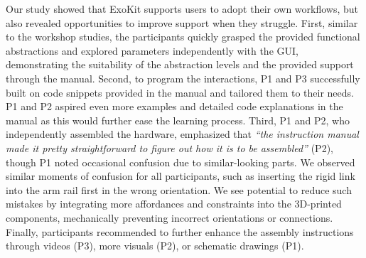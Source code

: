 Our study showed that ExoKit supports users to adopt their own workflows, but also revealed opportunities to improve support when they struggle.  
First, similar to the workshop studies, the participants quickly grasped the provided functional abstractions and explored parameters independently with the GUI, demonstrating the suitability of the abstraction levels and the provided support through the manual.  
Second, to program the interactions, P1 and P3 successfully built on code snippets provided in the manual and tailored them to their needs. P1 and P2 aspired even more examples and detailed code explanations in the manual as this would further ease the learning process. 
Third, P1 and P2, who independently assembled the hardware, emphasized that \textit{``the instruction manual made it pretty straightforward to figure out how it is to be assembled''} (P2), though P1 noted occasional confusion due to similar-looking parts. 
We observed similar moments of confusion for all participants, such as inserting the rigid link into the arm rail first in the wrong orientation. We see potential to reduce such mistakes by integrating more affordances and constraints into the 3D-printed components, mechanically preventing incorrect orientations or connections. Finally, participants recommended to further enhance the assembly instructions through videos (P3), more visuals (P2), or schematic drawings (P1). 